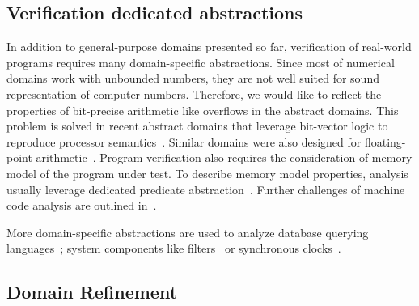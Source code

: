 \subsection{Verification dedicated abstractions}

In addition to general-purpose domains presented so far, verification of
real-world programs requires many domain-specific abstractions. Since most of
numerical domains work with unbounded numbers, they are not well suited for
sound representation of computer numbers. Therefore, we would like to reflect
the properties of bit-precise arithmetic like overflows in the abstract
domains.  This problem is solved in recent abstract domains that leverage
bit-vector logic to reproduce processor semantics~\cite{Sharma2013,
Sharma2017}. Similar domains were also designed for floating-point
arithmetic~\cite{Putot2004}.  Program verification also requires the
consideration of memory model of the program under test. To describe memory
model properties, analysis usually leverage dedicated predicate
abstraction~\cite{Dan2013}. Further challenges of machine code analysis are
outlined in~\cite{Reps2010}.

More domain-specific abstractions are used to analyze database querying
languages~\cite{Halder2012}; system components like filters~\cite{Feret2004} or
syn\-chro\-nous clocks~\cite{Feret2005}.

\subsection{Domain Refinement}
\label{sec:domainrefinement}

